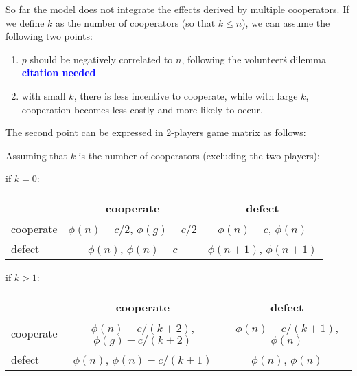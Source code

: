 \documentclass{article}
\newcommand{\todo}[1]{
	\textcolor{blue}{\textbf{#1}}
}
\begin{document}
So far the model does not integrate the effects derived by multiple cooperators. If we define $k$ as the number of cooperators (so that $k\leq n$), we can assume the following two points:

\begin{enumerate}
\item $p$ should be negatively correlated to $n$, following the volunteer\'s dilemma \todo{citation needed}
\item with small $k$, there is less incentive to cooperate, while with large $k$, cooperation becomes less costly and more likely to occur.
\end{enumerate}

The second point can be expressed in 2-players game matrix as follows:

Assuming that $k$ is the number of cooperators (excluding the two players):

\vspace{10 mm}


if $k=0$:

\begin{center}
\begin{tabular} {|l|c|c|}
\hline
 &cooperate&defect \\ \hline
cooperate&$\phi(n)-c/2$, $\phi(g)-c/2$&$\phi(n)-c$, $\phi(n)$ \\ \hline
defect&$\phi(n)$, $\phi(n)-c$&$\phi(n+1)$, $\phi(n+1)$ \\ \hline
\end{tabular}
\end{center}


if $k>1$:

\begin{center}
\begin{tabular} {|l|c|c|}
\hline
 &cooperate&defect \\ \hline
cooperate&$\phi(n)-c/(k+2)$, $\phi(g)-c/(k+2)$&$\phi(n)-c/(k+1)$, $\phi(n)$ \\ \hline
defect&$\phi(n)$, $\phi(n)-c/(k+1)$&$\phi(n)$, $\phi(n)$ \\ \hline
\end{tabular}
\end{center}



\end{document}
